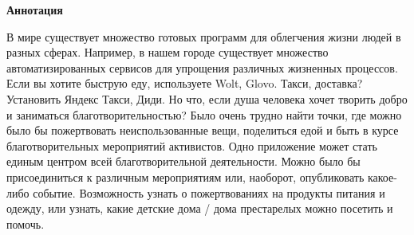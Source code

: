 \newpage
\pagestyle{plain}

{
\begin{center}
    \Large
    \textbf{Аннотация}
\end{center}
В мире существует множество готовых программ для облегчения жизни людей в разных сферах. Например, в нашем городе существует множество автоматизированных сервисов для упрощения различных жизненных процессов. Если вы хотите быструю еду, используете Wolt, Glovo. Такси, доставка? Установить Яндекс Такси, Диди. Но что, если душа человека хочет творить добро и заниматься благотворительностью? Было очень трудно найти точки, где можно было бы пожертвовать неиспользованные вещи, поделиться едой и быть в курсе благотворительных мероприятий активистов. Одно приложение может стать единым центром всей благотворительной деятельности. Можно было бы присоединиться к различным мероприятиям или, наоборот, опубликовать какое-либо событие. Возможность узнать о пожертвованиях на продукты питания и одежду, или узнать, какие детские дома / дома престарелых можно посетить и помочь.
}